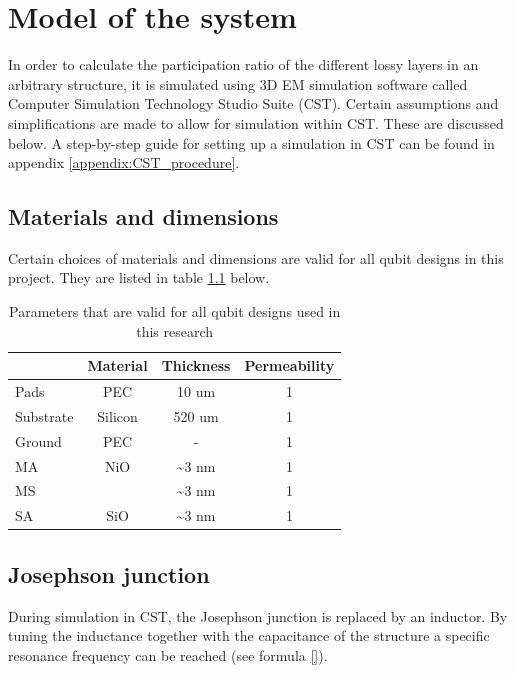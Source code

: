 \chapter{Model of the system}
In order to calculate the participation ratio of the different lossy layers in an arbitrary structure, it is simulated using 3D EM simulation software called Computer Simulation Technology Studio Suite (CST). Certain assumptions and simplifications are made to allow for simulation within CST. These are discussed below. A step-by-step guide for setting up a simulation in CST can be found in appendix \ref{appendix:CST_procedure}.

\section{Materials and dimensions}
Certain choices of materials and dimensions are valid for all qubit designs in this project. They are listed in table \ref{table:standard_parameters} below.

\begin{table}
	\begin{center}
		\begin{tabular}{ | l || c | c | c |}
			\hline
			 & Material & Thickness & Permeability \\ \hline
			Pads & PEC & 10 um & 1 \\
			Substrate & Silicon & 520 um & 1 \\
			Ground & PEC & - & 1 \\
			MA & NiO & \textasciitilde 3 nm & 1 \\
			MS &  & \textasciitilde 3 nm & 1 \\
			SA & SiO & \textasciitilde 3 nm & 1 \\
			\hline
		\end{tabular}
	\end{center}
	\caption{Parameters that are valid for all qubit designs used in this research}
	\label{table:standard_parameters}
\end{table}


\section{Josephson junction}
During simulation in CST, the Josephson junction is replaced by an inductor. By tuning the inductance together with the capacitance of the structure a specific resonance frequency can be reached (see formula \eqref{}). 


